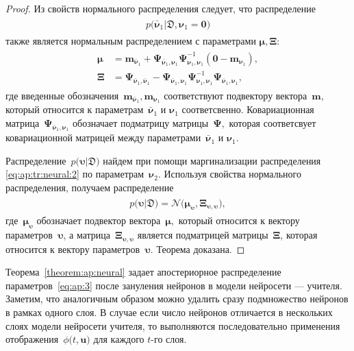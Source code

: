 \documentclass[12pt]{a&t}
\begin{document}
\begin{proof}
Из свойств нормального распределения следует, что распределение
\begin{gather}
\label{eq:ap:tr:neural:2}
\begin{aligned}
p\bigr(\bar{\bm{\nu}}_1|\mathfrak{D}, \bm{\nu}_1=\mathbf{0}\bigr)
\end{aligned}
\end{gather}
также является нормальным распределением с параметрами $\bm{\mu}, \bm{\Xi}$:
\begin{gather}
\label{eq:ap:tr:1:1}
\begin{aligned}
\bm{\mu} &= \mathbf{m}_{\bar{\bm{\nu}}_1}+\bm{\Psi}_{\bar{\bm{\nu}}_1,\bm{\nu}_1} \bm{\Psi}_{\bm{\nu}_1,\bm{\nu}_1}^{-1} \left(\mathbf{0} - \mathbf{m}_{\bm{\nu}_1}\right), \\
 \bm{\Xi} &= \bm{\Psi}_{\bar{\bm{\nu}}_1,\bar{\bm{\nu}}_1} - \bm{\Psi}_{\bar{\bm{\nu}}_1,\bm{\nu}_1} \bm{\Psi}_{\bm{\nu}_1,\bm{\nu}_1}^{-1} \bm{\Psi}_{\bar{\bm{\nu}}_1,\bm{\nu}_1},
\end{aligned}
\end{gather}
где введенные обозначения~$\mathbf{m}_{\bar{\bm{\nu}}_1}, \mathbf{m}_{\bm{\nu}_1}$ соответствуют подвектору вектора~$\mathbf{m},$ который относится к параметрам~$\bar{\bm{\nu}}_1$ и $\bm{\nu}_1$ соответсвенно. Ковариационная матрица~$\bm{\Psi}_{\bar{\bm{\nu}}_1,\bm{\nu}_1}$ обозначает подматрицу матрицы~$\bm{\Psi},$ которая соответсвует ковариационной матрицей между параметрами~$\bar{\bm{\nu}}_1$ и $\bm{\nu}_1.$

Распределение~$p\bigr(\bm{\upsilon}|\mathfrak{D}\bigr)$ найдем при помощи маргинализации распределения \eqref{eq:ap:tr:neural:2} по параметрам~$\bm{\nu}_2.$ Используя свойства нормального распределения, получаем распределение
\begin{gather}
\label{eq:ap:3}
\begin{aligned}
p\bigr(\bm{\upsilon}|\mathfrak{D}\bigr) = \mathcal{N}\bigr(\bm{\mu}_{\bm{\upsilon}},  \bm{\Xi}_{\bm{\upsilon}, \bm{\upsilon}}\bigr),
\end{aligned}
\end{gather}
где~$\bm{\mu}_{\bm{\upsilon}}$ обозначает подвектор вектора~$\bm{\mu},$ который относится к вектору параметров~$\bm{\upsilon}$, а матрица~$\bm{\Xi}_{\bm{\upsilon}, \bm{\upsilon}}$ является подматрицей матрицы~$\bm{\Xi}$, которая относится к вектору параметров~$\bm{\upsilon}.$ Теорема доказана.
\end{proof}

Теорема~\ref{theorem:ap:neural} задает апостериорное распределение параметров~\eqref{eq:ap:3} после зануления нейронов в модели нейросети --- учителя. Заметим, что аналогичным образом можно удалить сразу подмножество нейронов в рамках одного слоя. В случае если число нейронов отличается в нескольких слоях модели нейросети учителя, то выполняются последовательно применения отображения~$\phi\bigr(t, \mathbf{u}\bigr)$ для каждого $t$-го слоя.
\end{document}

